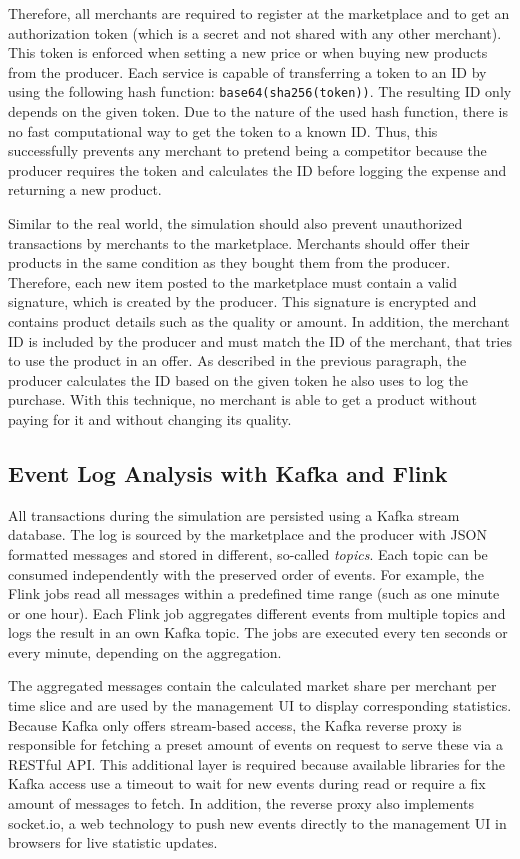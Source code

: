 Therefore, all merchants are required to register at the marketplace and to get an authorization token (which is a secret and not shared with any other merchant). This token is enforced when setting a new price or when buying new products from the producer. Each service is capable of transferring a token to an ID by using the following hash function: \texttt{base64(sha256(token))}. The resulting ID only depends on the given token. Due to the nature of the used hash function, there is no fast computational way to get the token to a known ID. Thus, this successfully prevents any merchant to pretend being a competitor because the producer requires the token and calculates the ID before logging the expense and returning a new product.

Similar to the real world, the simulation should also prevent unauthorized transactions by merchants to the marketplace. Merchants should offer their products in the same condition as they bought them from the producer. Therefore, each new item posted to the marketplace must contain a valid signature, which is created by the producer. This signature is encrypted and contains product details such as the quality or amount. In addition, the merchant ID is included by the producer and must match the ID of the merchant, that tries to use the product in an offer. As described in the previous paragraph, the producer calculates the ID based on the given token he also uses to log the purchase. With this technique, no merchant is able to get a product without paying for it and without changing its quality.

%
\subsection{Event Log Analysis with Kafka and Flink}
\label{sec:LogAnalysis}
%

All transactions during the simulation are persisted using a Kafka stream database. The log is sourced by the marketplace and the producer with JSON formatted messages and stored in different, so-called \emph{topics}. Each topic can be consumed independently with the preserved order of events. For example, the Flink jobs read all messages within a predefined time range (such as one minute or one hour). Each Flink job aggregates different events from multiple topics and logs the result in an own Kafka topic. The jobs are executed every ten seconds or every minute, depending on the aggregation.

The aggregated messages contain the calculated market share per merchant per time slice and are used by the management UI to display corresponding statistics. Because Kafka only offers stream-based access, the Kafka reverse proxy is responsible for fetching a preset amount of events on request to serve these via a RESTful API. This additional layer is required because available libraries for the Kafka access use a timeout to wait for new events during read or require a fix amount of messages to fetch. In addition, the reverse proxy also implements socket.io, a web technology to push new events directly to the management UI in browsers for live statistic updates. 

